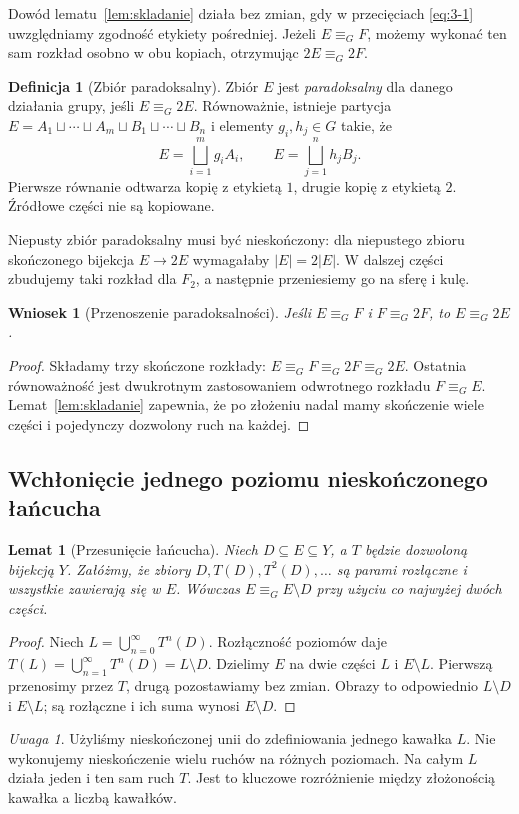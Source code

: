 \documentclass[11pt,a4paper]{article}
\numberwithin{equation}{section}
\theoremstyle{plain}
\newtheorem{lemat}[twierdzenie]{Lemat}
\newtheorem{wniosek}[twierdzenie]{Wniosek}
\theoremstyle{definition}
\newtheorem{definicja}[twierdzenie]{Definicja}
\theoremstyle{remark}
\newtheorem{uwaga}[twierdzenie]{Uwaga}
\newcommand{\equivG}{\mathrel{\equiv_G}}
\begin{document}
Dowód lematu~\ref{lem:skladanie} działa bez zmian, gdy w przecięciach \eqref{eq:3-1} uwzględniamy zgodność etykiety pośredniej. Jeżeli $E\equivG F$, możemy wykonać ten sam rozkład osobno w obu kopiach, otrzymując $2E\equivG2F$.
\begin{definicja}[Zbiór paradoksalny]\label{def:paradoksalny}
Zbiór $E$ jest \emph{paradoksalny} dla danego działania grupy, jeśli $E\equivG2E$. Równoważnie, istnieje partycja $E=A_1\sqcup\cdots\sqcup A_m\sqcup B_1\sqcup\cdots\sqcup B_n$ i elementy $g_i,h_j\in G$ takie, że
\[
 E=\bigsqcup_{i=1}^{m}g_iA_i,\qquad E=\bigsqcup_{j=1}^{n}h_jB_j.
\]
Pierwsze równanie odtwarza kopię z etykietą $1$, drugie kopię z etykietą $2$. Źródłowe części nie są kopiowane.
\end{definicja}
Niepusty zbiór paradoksalny musi być nieskończony: dla niepustego zbioru skończonego bijekcja $E\to2E$ wymagałaby $|E|=2|E|$. W dalszej części zbudujemy taki rozkład dla $F_2$, a następnie przeniesiemy go na sferę i kulę.
\begin{wniosek}[Przenoszenie paradoksalności]\label{wn:przenoszenie}
Jeśli $E\equivG F$ i $F\equivG2F$, to $E\equivG2E$.
\end{wniosek}
\begin{proof}
Składamy trzy skończone rozkłady: $E\equivG F\equivG2F\equivG2E$. Ostatnia równoważność jest dwukrotnym zastosowaniem odwrotnego rozkładu $F\equivG E$. Lemat~\ref{lem:skladanie} zapewnia, że po złożeniu nadal mamy skończenie wiele części i pojedynczy dozwolony ruch na każdej.
\end{proof}
\subsection{Wchłonięcie jednego poziomu nieskończonego łańcucha}
\begin{lemat}[Przesunięcie łańcucha]\label{lem:lancuch}
Niech $D\subseteq E\subseteq Y$, a $T$ będzie dozwoloną bijekcją $Y$. Załóżmy, że zbiory $D,T(D),T^2(D),\ldots$ są parami rozłączne i wszystkie zawierają się w $E$. Wówczas $E\equivG E\setminus D$ przy użyciu co najwyżej dwóch części.
\end{lemat}
\begin{proof}
Niech $L=\bigcup_{n=0}^{\infty}T^n(D)$. Rozłączność poziomów daje $T(L)=\bigcup_{n=1}^{\infty}T^n(D)=L\setminus D$. Dzielimy $E$ na dwie części $L$ i $E\setminus L$. Pierwszą przenosimy przez $T$, drugą pozostawiamy bez zmian. Obrazy to odpowiednio $L\setminus D$ i $E\setminus L$; są rozłączne i ich suma wynosi $E\setminus D$.
\end{proof}
\begin{uwaga}
Użyliśmy nieskończonej unii do zdefiniowania jednego kawałka $L$. Nie wykonujemy nieskończenie wielu ruchów na różnych poziomach. Na całym $L$ działa jeden i ten sam ruch $T$. Jest to kluczowe rozróżnienie między złożonością kawałka a liczbą kawałków.
\end{uwaga}
\end{document}
